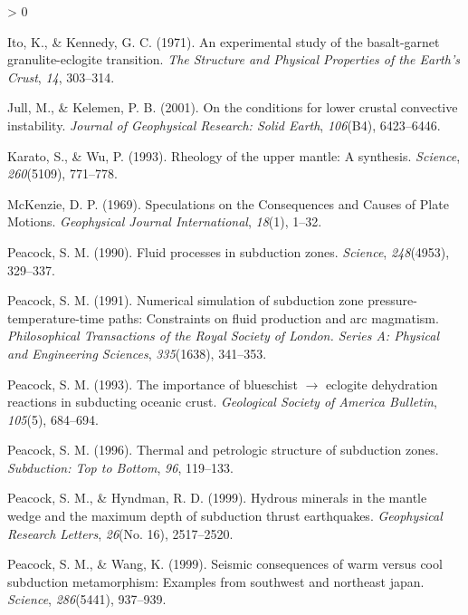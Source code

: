 \documentclass[draft,linenumbers]{agujournal2018}
\newlength{\cslhangindent}
\newenvironment{CSLReferences}[2] %
 {%
  \setlength{\parindent}{0pt}
  \ifodd #1 \everypar{\setlength{\hangindent}{\cslhangindent}}\ignorespaces\fi
  \ifnum #2 > 0
  \setlength{\parskip}{#2\baselineskip}
  \fi
 }%
 {}
\begin{document}
\begin{CSLReferences}{1}{0}
\leavevmode{}%
Ito, K., \& Kennedy, G. C. (1971). An experimental study of the
basalt-garnet granulite-eclogite transition. \emph{The Structure and
Physical Properties of the Earth's Crust}, \emph{14}, 303--314.

\leavevmode{}%
Jull, M., \& Kelemen, P. B. (2001). On the conditions for lower crustal
convective instability. \emph{Journal of Geophysical Research: Solid
Earth}, \emph{106}(B4), 6423--6446.

\leavevmode{}%
Karato, S., \& Wu, P. (1993). Rheology of the upper mantle: A synthesis.
\emph{Science}, \emph{260}(5109), 771--778.

\leavevmode{}%
McKenzie, D. P. (1969). {Speculations on the Consequences and Causes of
Plate Motions}. \emph{Geophysical Journal International}, \emph{18}(1),
1--32.

\leavevmode{}%
Peacock, S. M. (1990). Fluid processes in subduction zones.
\emph{Science}, \emph{248}(4953), 329--337.

\leavevmode{}%
Peacock, S. M. (1991). Numerical simulation of subduction zone
pressure-temperature-time paths: Constraints on fluid production and arc
magmatism. \emph{Philosophical Transactions of the Royal Society of
London. Series A: Physical and Engineering Sciences}, \emph{335}(1638),
341--353.

\leavevmode{}%
Peacock, S. M. (1993). The importance of blueschist \(\rightarrow\)
eclogite dehydration reactions in subducting oceanic crust.
\emph{Geological Society of America Bulletin}, \emph{105}(5), 684--694.

\leavevmode{}%
Peacock, S. M. (1996). Thermal and petrologic structure of subduction
zones. \emph{Subduction: Top to Bottom}, \emph{96}, 119--133.

\leavevmode{}%
Peacock, S. M., \& Hyndman, R. D. (1999). {Hydrous minerals in the
mantle wedge and the maximum depth of subduction thrust earthquakes}.
\emph{Geophysical Research Letters}, \emph{26}(No. 16), 2517--2520.

\leavevmode{}%
Peacock, S. M., \& Wang, K. (1999). Seismic consequences of warm versus
cool subduction metamorphism: Examples from southwest and northeast
japan. \emph{Science}, \emph{286}(5441), 937--939.


\end{CSLReferences}
\end{document}

